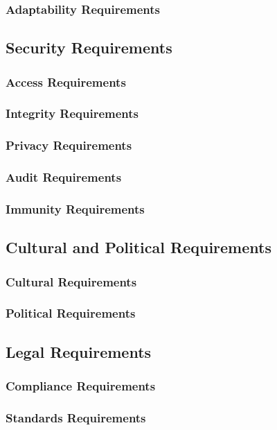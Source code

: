 \documentclass{article}
\begin{document}
    \subsubsection{Adaptability Requirements}
    
\subsection{Security Requirements}
    \subsubsection{Access Requirements}
    \subsubsection{Integrity Requirements}
    \subsubsection{Privacy Requirements}
    \subsubsection{Audit Requirements}
    \subsubsection{Immunity Requirements}
    
\subsection{Cultural and Political Requirements}
    \subsubsection{Cultural Requirements}
    \subsubsection{Political Requirements}    
    
\subsection{Legal Requirements}
    \subsubsection{Compliance Requirements}
    \subsubsection{Standards Requirements}    
\end{document}
